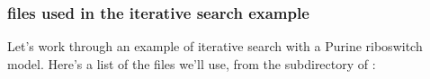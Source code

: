 



\subsubsection{files used in the iterative search example}

Let's work through an example of iterative search with a Purine
riboswitch model. Here's a list of the files we'll use, from the
 subdirectory of :

